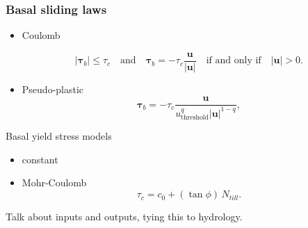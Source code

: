 \documentclass[hide notes,intlimits]{beamer}
\begin{document}
\begin{frame}
  \frametitle{Basal sliding laws}

  \begin{itemize}
  \item Coulomb

    \begin{equation}
      \label{eq:11}
      |\boldsymbol{\tau}_b| \le \tau_c \quad \text{and} \quad \boldsymbol{\tau}_b =
      - \tau_c \frac{\mathbf{u}}{|\mathbf{u}|} \quad\text{if and only if}\quad |\mathbf{u}| > 0.
    \end{equation}
  \item Pseudo-plastic
  \begin{equation}
    \label{eq:10}
    \boldsymbol{\tau}_b =  - \tau_c \frac{\mathbf{u}}{u_{\text{threshold}}^q |\mathbf{u}|^{1-q}},
  \end{equation}
  \end{itemize}
\end{frame}

\begin{frame}{Basal yield stress models}
  \begin{itemize}
  \item constant
  \item Mohr-Coulomb
    \begin{equation}
      \label{eq:12}
      \tau_c = c_{0} + (\tan\phi)\,N_{till}.
    \end{equation}
  \end{itemize}

  Talk about inputs and outputs, tying this to hydrology.
\end{frame}
\end{document}
